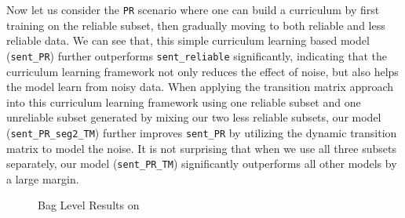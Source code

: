 Now let us consider the \texttt{PR} scenario where one can build a curriculum by first training on the
reliable subset, then gradually moving to both reliable and less
reliable data. We can see that, this simple curriculum learning based model
(\texttt{sent\_PR}) further outperforms \texttt{sent\_reliable} significantly,
indicating that the curriculum learning framework not only reduces the effect
of noise, but also helps the model learn from noisy data. When applying the
transition matrix approach into this curriculum learning framework using one reliable
subset and one unreliable subset generated by mixing our two less reliable subsets, our model (\texttt{sent\_PR\_seg2\_TM})
further improves \texttt{sent\_PR} by  %
utilizing the dynamic transition matrix to model the noise.
It is not surprising that when we use all three subsets separately,
our model (\texttt{sent\_PR\_TM}) significantly outperforms all
other models by a large margin.

\begin{figure}[t!]
\setlength{\abovecaptionskip}{3pt}
\setlength{\belowcaptionskip}{-10pt}
\centering
{}
\caption{Bag Level Results on \TimeRE}
\label{fig: results_on_luo}
\end{figure}


